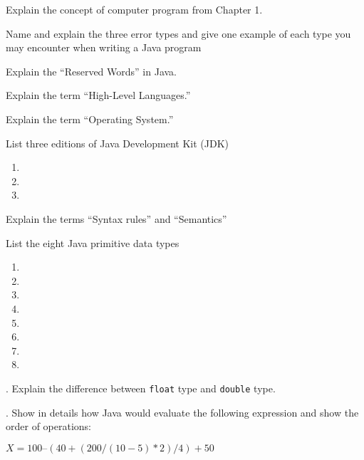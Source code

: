 \documentclass[12pt]{exam}
\begin{document}
\begin{questions}

\question[5]  Explain the concept of computer program from Chapter 1.
\makeemptybox{2in}
\addpoints

\question[5] Name and explain the three error types and give one example of each type you may encounter when writing a Java program
\makeemptybox{2in}
\addpoints

\question[5] Explain the ``Reserved Words'' in Java.

\makeemptybox{2in}
\addpoints

\question[5] Explain the term ``High-Level Languages.''

\makeemptybox{2in}
\addpoints


\question[5] Explain the term ``Operating System.''

\makeemptybox{2in}
\addpoints


\question[5] List three editions of Java Development Kit (JDK)

\begin{enumerate}
    \item 
    \item
    \item
\end{enumerate}
\addpoints

\question[5] Explain the terms ``Syntax rules'' and ``Semantics''

\makeemptybox{2in}
\addpoints

\question[5] List the eight Java primitive data types

\begin{enumerate}
    \item 
    \item
    \item
    \item
    \item
    \item
    \item 
    \item
\end{enumerate}
\addpoints

\question[5]. Explain the difference between \texttt{float} type and \texttt{double} type.

\makeemptybox{2in}
\addpoints

\question[5]. Show in details how Java would evaluate the following expression and show the order of operations:

$X = 100 – (40 + (200 / (10 - 5) * 2) / 4) + 50$


\end{questions}
\end{document}
